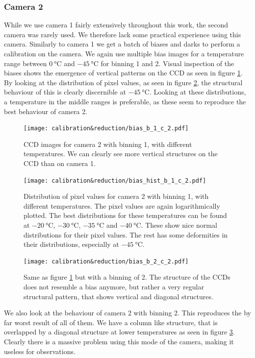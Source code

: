 \documentclass{article}
\begin{document}
\subsubsection{Camera 2}
While we use camera 1 fairly extensively throughout this work, the second camera was rarely used. We therefore lack some practical experience using this camera. Similarly to camera 1 we get a batch of biases and darks to perform a calibration on the camera. We again use multiple bias images for a temperature range between $\SI{0}{\celsius}$ and $\SI{-45}{\celsius}$ for binning 1 and 2.\newline
Visual inspection of the biases shows the emergence of vertical patterns on the CCD as seen in figure \ref{fig:Bias_old_c_2_calib}. By looking at the distribution of pixel values, as seen in figure \ref{fig:Bias_c2_b_1_hist}, the structural behaviour of this is clearly discernible at $\SI{-45}{\celsius}$. Looking at these distributions, a temperature in the middle ranges is preferable, as these seem to reproduce the best behaviour of camera 2.\newline
\begin{figure}[H]
    \centering
    \texttt{[image: calibration\&reduction/bias\_b\_1\_c\_2.pdf]}
    \caption{CCD images for camera 2 with binning 1, with different temperatures. We can clearly see more vertical structures on the CCD than on camera 1.}
    \label{fig:Bias_old_c_2_calib}
\end{figure}
\begin{figure}[H]
    \centering
    \texttt{[image: calibration\&reduction/bias\_hist\_b\_1\_c\_2.pdf]}
    \caption{Distribution of pixel values for camera 2 with binning 1, with different temperatures. The pixel values are again logarithmically plotted. The best distributions for these temperatures can be found at $\SI{-20}{\celsius}$, $\SI{-30}{\celsius}$, $\SI{-35}{\celsius}$ and $\SI{-40}{\celsius}$. These show nice normal distributions for their pixel values. The rest has some deformities in their distributions, especially at $\SI{-45}{\celsius}$.}
    \label{fig:Bias_c2_b_1_hist}
\end{figure}
\begin{figure}[H]
    \centering
    \texttt{[image: calibration\&reduction/bias\_b\_2\_c\_2.pdf]}
    \caption{Same as figure \ref{fig:Bias_old_c_2_calib} but with a binning of 2. The structure of the CCDs does not resemble a bias anymore, but rather a very regular structural pattern, that shows vertical and diagonal structures.}
    \label{fig:Bias_old_c_2_calib_b_2}
\end{figure}
We also look at the behaviour of camera 2 with binning 2. This reproduces the by far worst result of all of them. We have a column like structure, that is overlapped by a diagonal structure at lower temperatures as seen in figure \ref{fig:Bias_old_c_2_calib_b_2}. Clearly there is a massive problem using this mode of the camera, making it useless for observations.
\end{document}
